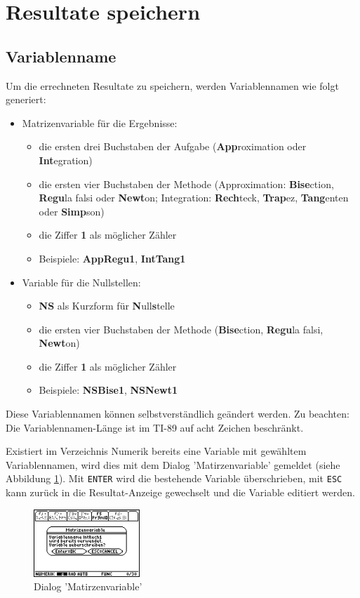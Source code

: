 \documentclass[a5paper,9pt]{scrreprt}
\begin{document}
\newpage
\section{Resultate speichern}
\subsection{Variablenname}
Um die errechneten Resultate zu speichern, werden Variablennamen wie folgt generiert:
\begin{itemize}
    \item Matrizenvariable f\"ur die Ergebnisse:
    \begin{itemize}
      \item die ersten drei Buchstaben der Aufgabe (\textbf{App}roximation oder \textbf{Int}egration)
      \item die ersten vier Buchstaben der Methode (Approximation: \textbf{Bise}ction, \textbf{Regu}la falsi oder \textbf{Newt}on; Integration: \textbf{Rech}teck, \textbf{Trap}ez, \textbf{Tang}enten oder \textbf{Simp}son)
      \item die Ziffer \textbf{1} als m\"oglicher Z\"ahler
      \item Beispiele: \textbf{AppRegu1}, \textbf{IntTang1}
    \end{itemize}
    \item Variable f\"ur die Nullstellen:
    \begin{itemize}
      \item \textbf{NS} als Kurzform f\"ur \textbf{N}ull\textbf{s}telle
      \item die ersten vier Buchstaben der Methode (\textbf{Bise}ction, \textbf{Regu}la falsi, \textbf{Newt}on)
      \item die Ziffer \textbf{1} als m\"oglicher Z\"ahler
      \item Beispiele: \textbf{NSBise1}, \textbf{NSNewt1}
    \end{itemize}
\end{itemize}
Diese Variablennamen k\"onnen selbstverst\"andlich ge\"andert werden. Zu beachten: Die Variablennamen-L\"ange ist im TI-89 auf acht Zeichen beschr\"ankt.

Existiert im Verzeichnis Numerik bereits eine Variable mit gew\"ahltem Variablennamen, wird dies mit dem Dialog 'Matirzenvariable' gemeldet (siehe Abbildung \ref{fig:Matirzenvariable}). Mit \verb|ENTER| wird die bestehende Variable \"uberschrieben, mit \verb|ESC| kann zur\"uck in die Resultat-Anzeige gewechselt und die Variable editiert werden.
\begin{figure}[h]
  \centering
  \includegraphics[width=4cm]{img/nummeth_image032.png}
  \caption{Dialog 'Matirzenvariable'}
  \label{fig:Matirzenvariable}
\end{figure}
\end{document}
